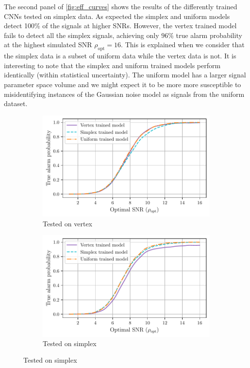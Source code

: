 \documentclass[12pt]{iopart}
\begin{document}
%
The second panel of \cref{fig:eff_curves} shows the results of the differently trained \acp{CNN} tested on simplex data. As expected the simplex and uniform models detect 100\% of the signals at higher \acp{SNR}. However, the vertex trained model fails to detect all the simplex signals, achieving only $96\%$ true alarm probability at the highest simulated \ac{SNR} $\rho_{\text{opt}}=16$. This is explained when we consider that the simplex data is a subset of uniform data while the vertex data is not. It is interesting to note that the simplex and uniform trained models perform identically (within statistical uncertainty). The uniform model has a larger signal parameter space volume and we might expect it to be more more susceptible to misidentifying instances of the Gaussian noise model as signals from the uniform dataset.    
\begin{figure} %
\centering
\begin{subfigure}{1\textwidth}
\centering
\includegraphics[scale=0.85]{figures/efficiency_curve_vtest.pdf}
\caption{Tested on vertex}
\end{subfigure}

\begin{subfigure}{1\textwidth}
\centering
\includegraphics[scale=0.85]{figures/efficiency_curve_stest.pdf}
\caption{Tested on simplex}
\end{subfigure}


\end{figure}
\end{document}
